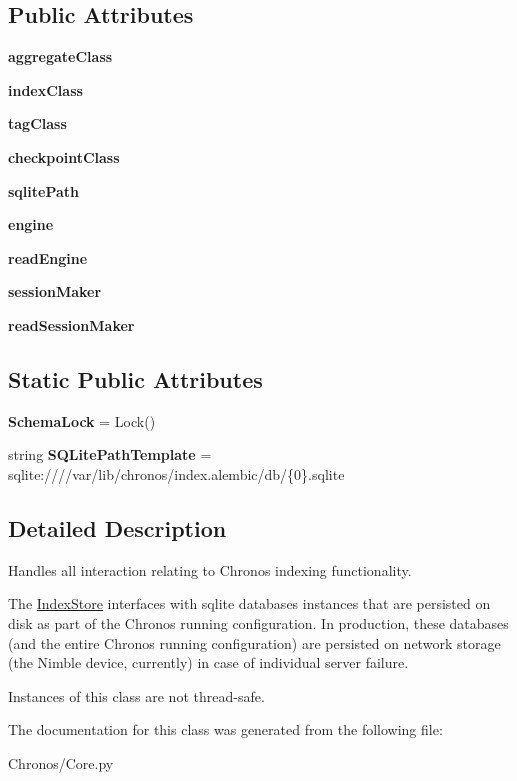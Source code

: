 \subsection*{Public Attributes}
\begin{DoxyCompactItemize}
\item 
{\bfseries aggregate\+Class}
\item 
{\bfseries index\+Class}
\item 
{\bfseries tag\+Class}
\item 
{\bfseries checkpoint\+Class}
\item 
{\bfseries sqlite\+Path}
\item 
{\bfseries engine}
\item 
{\bfseries read\+Engine}
\item 
{\bfseries session\+Maker}
\item 
{\bfseries read\+Session\+Maker}
\end{DoxyCompactItemize}
\subsection*{Static Public Attributes}
\begin{DoxyCompactItemize}
\item 
{\bfseries Schema\+Lock} = Lock()
\item 
string {\bfseries S\+Q\+Lite\+Path\+Template} = \textquotesingle{}sqlite\+:////var/lib/chronos/index.\+alembic/db/\{0\}.sqlite\textquotesingle{}
\end{DoxyCompactItemize}


\subsection{Detailed Description}
Handles all interaction relating to Chronos indexing functionality. 

The \hyperlink{classChronos_1_1Core_1_1IndexStore}{Index\+Store} interfaces with sqlite databases instances that are persisted on disk as part of the Chronos running configuration. In production, these databases (and the entire Chronos running configuration) are persisted on network storage (the Nimble device, currently) in case of individual server failure.

Instances of this class are not thread-\/safe. 

The documentation for this class was generated from the following file\+:\begin{DoxyCompactItemize}
\item 
Chronos/Core.\+py\end{DoxyCompactItemize}
